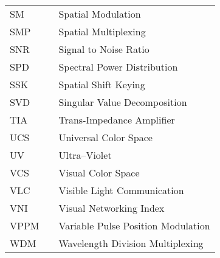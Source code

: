 \begin{center}
\begin{longtable}{lll}
		SM & \dotfill & Spatial Modulation \\
		SMP & \dotfill & Spatial Multiplexing \\
		SNR & \dotfill & Signal to Noise Ratio \\
		SPD & \dotfill & Spectral Power Distribution \\
		SSK & \dotfill & Spatial Shift Keying \\
		SVD & \dotfill & Singular Value Decomposition \\
		TIA & \dotfill & Trans-Impedance Amplifier \\
		UCS & \dotfill & Universal Color Space \\
		UV & \dotfill & Ultra--Violet \\
		VCS & \dotfill & Visual Color Space \\
    VLC  & \dotfill & Visible Light Communication \\
		VNI & \dotfill & Visual Networking Index \\
		VPPM & \dotfill & Variable Pulse Position Modulation \\
		WDM & \dotfill & Wavelength Division Multiplexing \\
  \end{longtable}
\end{center}